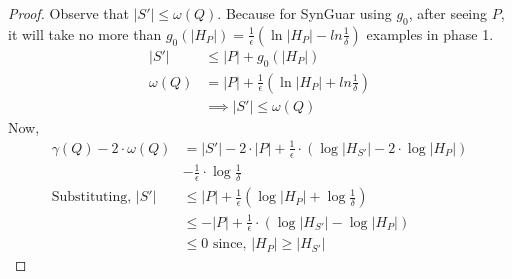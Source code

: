 \documentclass[11pt]{extarticle}
\newcommand{\tool}{{\sc SynGuar}\xspace}
\newcommand{\parf}{g}
\begin{document}
\begin{proof}
Observe that $|S'| \le \omega(Q)$. Because for \tool using $\parf_0$, after seeing $P$, it will take no more than $\parf_0(|H_{P}|)=\frac{1}{\epsilon}(\ln{|H_{P}|} - ln{\frac{1}{\delta}})$ examples in phase 1.
\begin{align*}
    |S'| &\le |P| + \parf_0(|H_{P}|)\\
    \omega(Q) &= |P| + \frac{1}{\epsilon}(\ln{|H_{P}|} + ln{\frac{1}{\delta}})\\
    &\implies |S'| \le \omega(Q)
\end{align*}
Now,
\begin{align*}
    \gamma(Q) - 2\cdot\omega(Q) &= |S'|- 2\cdot|P| +  \frac{1}{\epsilon}\cdot(\log{|H_{S'}|} - 2\cdot \log{|H_{P}|}) \\
    &- \frac{1}{\epsilon}\cdot\log{\frac{1}{\delta}}\\
    \text{Substituting, }|S'|&\leq|P|+\frac{1}{\epsilon}(\log{|H_{P}|}+\log{\frac{1}{\delta}})\\
    &\leq -|P| +\frac{1}{\epsilon}\cdot(\log{|H_{S'}|} - \log{|H_{P}|})\\
    &\leq 0\text{ since, }|H_{P}|\ge|H_{S'}|
\end{align*}
\end{proof}



\end{document}
